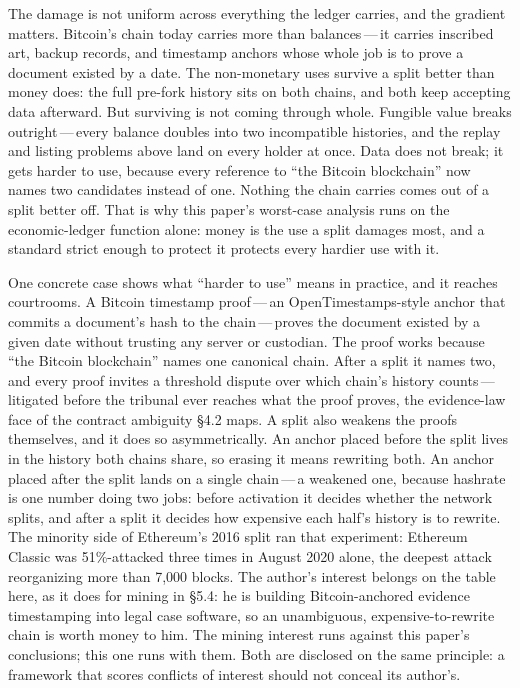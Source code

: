 \documentclass[11pt, twoside, openright]{book}
\newcommand{\sect}[1]{\S#1}
\begin{document}
The damage is not uniform across everything the ledger carries, and the gradient matters. Bitcoin's chain today carries more than balances\,---\,it carries inscribed art, backup records, and timestamp anchors whose whole job is to prove a document existed by a date. The non-monetary uses survive a split better than money does: the full pre-fork history sits on both chains, and both keep accepting data afterward. But surviving is not coming through whole. Fungible value breaks outright\,---\,every balance doubles into two incompatible histories, and the replay and listing problems above land on every holder at once. Data does not break; it gets harder to use, because every reference to ``the Bitcoin blockchain'' now names two candidates instead of one. Nothing the chain carries comes out of a split better off. That is why this paper's worst-case analysis runs on the economic-ledger function alone: money is the use a split damages most, and a standard strict enough to protect it protects every hardier use with it.

One concrete case shows what ``harder to use'' means in practice, and it reaches courtrooms. A Bitcoin timestamp proof\,---\,an OpenTimestamps-style anchor that commits a document's hash to the chain\,---\,proves the document existed by a given date without trusting any server or custodian. The proof works because ``the Bitcoin blockchain'' names one canonical chain. After a split it names two, and every proof invites a threshold dispute over which chain's history counts\,---\,litigated before the tribunal ever reaches what the proof proves, the evidence-law face of the contract ambiguity \sect{4.2} maps. A split also weakens the proofs themselves, and it does so asymmetrically. An anchor placed before the split lives in the history both chains share, so erasing it means rewriting both. An anchor placed after the split lands on a single chain\,---\,a weakened one, because hashrate is one number doing two jobs: before activation it decides whether the network splits, and after a split it decides how expensive each half's history is to rewrite. The minority side of Ethereum's 2016 split ran that experiment: Ethereum Classic was 51\%-attacked three times in August 2020 alone, the deepest attack reorganizing more than 7{,}000 blocks. The author's interest belongs on the table here, as it does for mining in \sect{5.4}: he is building Bitcoin-anchored evidence timestamping into legal case software, so an unambiguous, expensive-to-rewrite chain is worth money to him. The mining interest runs against this paper's conclusions; this one runs with them. Both are disclosed on the same principle: a framework that scores conflicts of interest should not conceal its author's.
\end{document}
